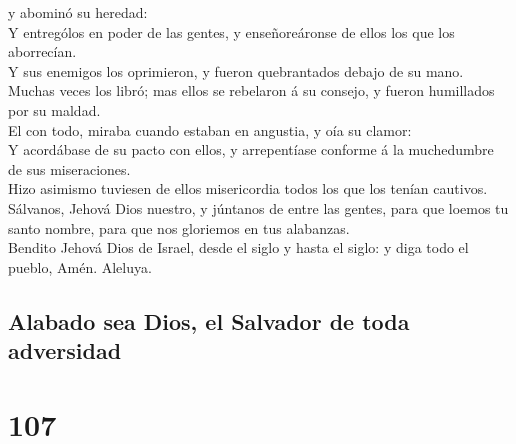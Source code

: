 y abominó su heredad:\\
 Y entrególos en poder de las gentes, y enseñoreáronse de
ellos los que los aborrecían.\\
 Y sus enemigos los oprimieron, y fueron quebrantados
debajo de su mano.\\
 Muchas veces los libró; mas ellos se rebelaron á su
consejo, y fueron humillados por su maldad.\\
 El con todo, miraba cuando estaban en angustia, y oía su
clamor:\\
 Y acordábase de su pacto con ellos, y arrepentíase
conforme á la muchedumbre de sus miseraciones.\\
 Hizo asimismo tuviesen de ellos misericordia todos los
que los tenían cautivos.\\
 Sálvanos, Jehová Dios nuestro, y júntanos de entre las
gentes, para que loemos tu santo nombre, para que nos gloriemos en tus
alabanzas.\\
 Bendito Jehová Dios de Israel, desde el siglo y hasta el
siglo: y diga todo el pueblo, Amén. Aleluya.

\hypertarget{alabado-sea-dios-el-salvador-de-toda-adversidad}{%
\subsection{Alabado sea Dios, el Salvador de toda
adversidad}\label{alabado-sea-dios-el-salvador-de-toda-adversidad}}

\hypertarget{section-19-107}{%
\section{107}\label{section-19-107}}

